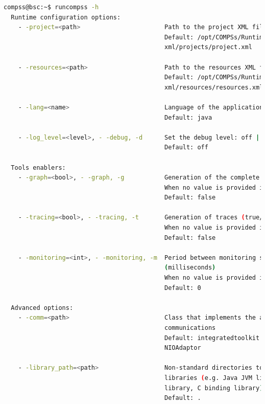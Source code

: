 \begin{lstlisting}[language=bash]
compss@bsc:~$ runcompss -h
  Runtime configuration options:
    - -project=<path>                       Path to the project XML file
                                            Default: /opt/COMPSs/Runtime/configuration/
                                            xml/projects/project.xml
                                            
    - -resources=<path>                     Path to the resources XML file
                                            Default: /opt/COMPSs/Runtime/configuration/
                                            xml/resources/resources.xml
                                            
    - -lang=<name>                          Language of the application (java/c/python)
                                            Default: java
                                            
    - -log_level=<level>, - -debug, -d      Set the debug level: off | info | debug
                                            Default: off

  Tools enablers:
    - -graph=<bool>, - -graph, -g           Generation of the complete graph (true/false)
                                            When no value is provided it is set to true
                                            Default: false
                                            
    - -tracing=<bool>, - -tracing, -t       Generation of traces (true/false)
                                            When no value is provided it is set to true
                                            Default: false
                                            
    - -monitoring=<int>, - -monitoring, -m  Period between monitoring samples 
                                            (milliseconds)
                                            When no value is provided it is set to 2000
                                            Default: 0

  Advanced options:
    - -comm=<path>                          Class that implements the adaptor for 
                                            communications
                                            Default: integratedtoolkit.nio.master.
                                            NIOAdaptor
                                            
    - -library_path=<path>                  Non-standard directories to search for 
                                            libraries (e.g. Java JVM library, Python 
                                            library, C binding library) 
                                            Default: .
                                            

\end{lstlisting}
